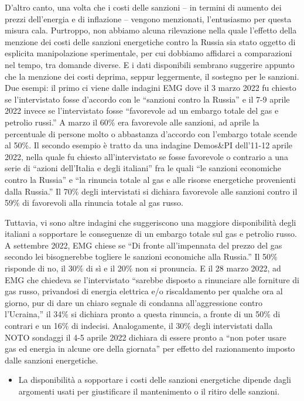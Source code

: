 \documentclass[
  openany]{book}
\providecommand{\tightlist}{%
  \setlength{\itemsep}{0pt}\setlength{\parskip}{0pt}}
\begin{document}
D'altro canto, una volta che i costi delle sanzioni -- in termini di aumento dei prezzi dell'energia e di inflazione -- vengono menzionati, l'entusiasmo per questa misura cala. Purtroppo, non abbiamo alcuna rilevazione nella quale l'effetto della menzione dei costi delle sanzioni energetiche contro la Russia sia stato oggetto di esplicita manipolazione sperimentale, per cui dobbiamo affidarci a comparazioni nel tempo, tra domande diverse. E i dati disponibili sembrano suggerire appunto che la menzione dei costi deprima, seppur leggermente, il sostegno per le sanzioni. Due esempi: il primo ci viene dalle indagini EMG dove il 3 marzo 2022 fu chiesto se l'intervistato fosse d'accordo con le ``sanzioni contro la Russia'' e il 7-9 aprile 2022 invece se l'intervistato fosse ``favorevole ad un embargo totale del gas e petrolio russi.'' A marzo il 60\% era favorevole alle sanzioni, ad aprile la percentuale di persone molto o abbastanza d'accordo con l'embargo totale scende al 50\%. Il secondo esempio è tratto da una indagine Demos\&PI dell'11-12 aprile 2022, nella quale fu chiesto all'intervistato se fosse favorevole o contrario a una serie di ``azioni dell'Italia e degli italiani'' fra le quali ``le sanzioni economiche contro la Russia'' e ``la rinuncia totale al gas e alle risorse energetiche provenienti dalla Russia.'' Il 70\% degli intervistati si dichiara favorevole alle sanzioni contro il 59\% di favorevoli alla rinuncia totale al gas russo.

Tuttavia, vi sono altre indagini che suggeriscono una maggiore disponibilità degli italiani a sopportare le conseguenze di un embargo totale sul gas e petrolio russo. A settembre 2022, EMG chiese se ``Di fronte all'impennata del prezzo del gas secondo lei bisognerebbe togliere le sanzioni economiche alla Russia.'' Il 50\% risponde di no, il 30\% di sì e il 20\% non si pronuncia. E il 28 marzo 2022, ad EMG che chiedeva se l'intervistato ``sarebbe disposto a rinunciare alle forniture di gas russo, privandosi di energia elettrica e/o riscaldamento per qualche ora al giorno, pur di dare un chiaro segnale di condanna all'aggressione contro l'Ucraina,'' il 34\% si dichiara pronto a questa rinuncia, a fronte di un 50\% di contrari e un 16\% di indecisi. Analogamente, il 30\% degli intervistati dalla NOTO sondaggi il 4-5 aprile 2022 dichiara di essere pronto a ``non poter usare gas ed energia in alcune ore della giornata'' per effetto del razionamento imposto dalle sanzioni energetiche.

\begin{itemize}
\tightlist
\item
  La disponibilità a sopportare i costi delle sanzioni energetiche dipende dagli argomenti usati per giustificare il mantenimento o il ritiro delle sanzioni.
\end{itemize}
\end{document}
